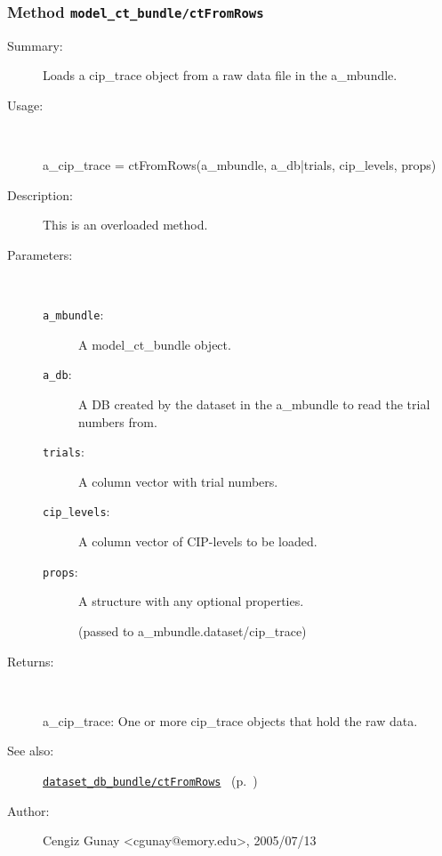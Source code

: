 \subsubsection[Method \texttt{ctFromRows}]{Method \texttt{model\_ct\_bundle/ctFromRows}}%
%
\label{ref_model_ct_bundle__ctFromRows}%
\hypertarget{ref_model_ct_bundle__ctFromRows}{}%
\begin{description}
\item[Summary:]Loads a cip\_trace object from a raw data file in the a\_mbundle.
%
\item[Usage:]~%
\begin{lyxcode}%
a\_cip\_trace = ctFromRows(a\_mbundle, a\_db|trials, cip\_levels, props)
%
\end{lyxcode}%
%
\item[Description:]%
This is an overloaded method.
\item[Parameters:]~
\begin{description}%
\item[\texttt{a\_mbundle}:]
 A model\_ct\_bundle object.
\item[\texttt{a\_db}:]
 A DB created by the dataset in the a\_mbundle to read the trial numbers from.
\item[\texttt{trials}:]
 A column vector with trial numbers.
\item[\texttt{cip\_levels}:]
 A column vector of CIP-levels to be loaded.
\item[\texttt{props}:]
 A structure with any optional properties.

(passed to a\_mbundle.dataset/cip\_trace)\end{description}%
%
\item[Returns:]~

	a\_cip\_trace: One or more cip\_trace objects that hold the raw data.
%
%
\item[See also:]%
\hyperlink{ref_dataset_db_bundle__ctFromRows}{\texttt{dataset\_db\_bundle/ctFromRows}}%
\ (p.~\pageref{ref_dataset_db_bundle__ctFromRows})%
%
%
\item[Author:]%
Cengiz Gunay <cgunay@emory.edu>, 2005/07/13%
\end{description}
\methodline%
